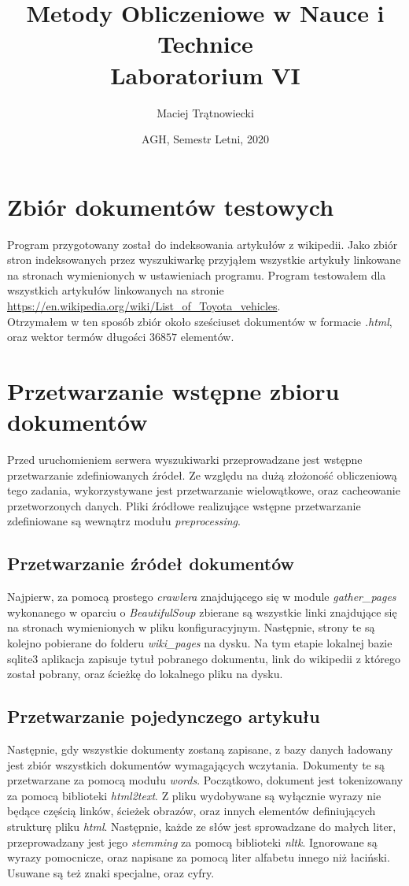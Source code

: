 \documentclass{article}
\title{Metody Obliczeniowe w Nauce i Technice\\ 
Laboratorium VI}
\author{Maciej Trątnowiecki}
\date{AGH, Semestr Letni, 2020}
\begin{document}
    \maketitle
    \section{Zbiór dokumentów testowych}
        Program przygotowany został do indeksowania artykułów z wikipedii. Jako zbiór stron indeksowanych przez wyszukiwarkę przyjąłem wszystkie artykuły linkowane na stronach wymienionych w ustawieniach programu. Program testowałem dla wszystkich artykułów linkowanych na stronie \url{https://en.wikipedia.org/wiki/List_of_Toyota_vehicles}.\\
        
        Otrzymałem w ten sposób zbiór około sześciuset dokumentów w formacie \textit{.html}, oraz wektor termów długości $36857$ elementów. 
        
    \section{Przetwarzanie wstępne zbioru dokumentów}
        Przed uruchomieniem serwera wyszukiwarki przeprowadzane jest wstępne przetwarzanie zdefiniowanych źródeł. Ze względu na dużą złożoność obliczeniową tego zadania, wykorzystywane jest przetwarzanie wielowątkowe, oraz cacheowanie przetworzonych danych. Pliki źródłowe realizujące wstępne przetwarzanie zdefiniowane są wewnątrz modułu \textit{preprocessing}.\\
        \subsection{Przetwarzanie źródeł dokumentów}
        Najpierw, za pomocą prostego \textit{crawlera} znajdującego się w module \textit{gather\_pages} wykonanego w oparciu o \textit{BeautifulSoup} zbierane są wszystkie linki znajdujące się na stronach wymienionych w pliku konfiguracyjnym. Następnie, strony te są kolejno pobierane do folderu \textit{wiki\_pages} na dysku. Na tym etapie lokalnej bazie sqlite3 aplikacja zapisuje tytuł pobranego dokumentu, link do wikipedii z którego został pobrany, oraz ścieżkę do lokalnego pliku na dysku. 
        
        \subsection{Przetwarzanie pojedynczego artykułu}
        Następnie, gdy wszystkie dokumenty zostaną zapisane, z bazy danych ładowany jest zbiór wszystkich dokumentów wymagających wczytania. Dokumenty te są przetwarzane za pomocą modułu \textit{words}. Początkowo, dokument jest tokenizowany za pomocą biblioteki \textit{html2text}. Z pliku wydobywane są wyłącznie wyrazy nie będące częścią linków, ścieżek obrazów, oraz innych elementów definiujących strukturę pliku \textit{html}. Następnie, każde ze słów jest sprowadzane do małych liter, przeprowadzany jest jego \textit{stemming} za pomocą biblioteki \textit{nltk}. Ignorowane są wyrazy pomocnicze, oraz napisane za pomocą liter alfabetu innego niż łaciński. Usuwane są też znaki specjalne, oraz cyfry. \\
        
\end{document}
